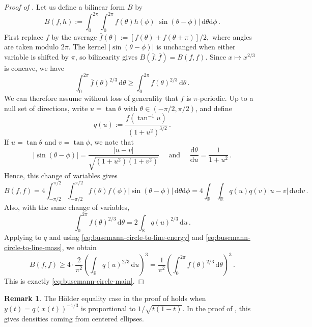 \documentclass[reqno, 11pt]{amsart}
\theoremstyle{definition}
\newtheorem{remark}{Remark}
\newcommand{\abs}[1]{\left\lvert#1\right\rvert}
\newcommand{\dd}{\mathrm{d}}
\begin{document}
\begin{proof}[Proof of ]
Let us define a bilinear form $B$ by
\[
        B(f,h):=\int_0^{2\pi}\int_0^{2\pi}
        f(\theta)h(\phi)\abs{\sin(\theta-\phi)}\,\dd\theta\dd\phi \,.
\]
First replace $f$ by the average $\bar f(\theta) := [f(\theta)+f(\theta+\pi)]/2,$ where angles are taken modulo $2\pi$.  The kernel $\abs{\sin(\theta-\phi)}$ is unchanged when either variable is shifted by $\pi$, so bilinearity gives $B(\bar f,\bar f)=B(f,f)$.  Since $x\mapsto x^{2/3}$ is concave, we have
\[
        \int_0^{2\pi} \bar f(\theta)^{2/3}\,\dd\theta
        \ge
        \int_0^{2\pi} f(\theta)^{2/3}\,\dd\theta\,.
\]
We can therefore assume without loss of generality that $f$ is $\pi$-periodic. Up to a null set of directions, write $u=\tan\theta$ with $\theta\in(-\pi/2,\pi/2)$, and define
\[
        q(u):=\frac{f(\tan^{-1} u)}{\,\,(1+u^2)^{3/2}}\,.
\]
If $u = \tan \theta$ and $v = \tan \phi$, we note that 
\[
        \abs{\sin(\theta-\phi)}
        =\frac{\abs{u-v}}{\sqrt{(1+u^2)(1+v^2)}}
        \quad \text{ and } \quad 
         \frac{\dd\theta}{\dd u}=\frac{1}{1+u^2}\,.
\]
Hence, this change of variables gives 
\begin{equation}\label{eq:busemann-circle-to-line-energy}
        B(f,f)
        =4\int_{-\pi/2}^{\pi/2}\int_{-\pi/2}^{\pi/2}
        f(\theta)f(\phi)\abs{\sin(\theta-\phi)}\,\dd\theta\dd\phi
        =4\int_{{\mathbb R}}\int_{{\mathbb R}}q(u)q(v)\abs{u-v}\,\dd u\dd v\,.
\end{equation}
Also, with the same change of variables,
\begin{equation}\label{eq:busemann-circle-to-line-mass}
        \int_0^{2\pi}f(\theta)^{2/3}\,\dd\theta
        =2\int_{{\mathbb R}}q(u)^{2/3}\,\dd u\,.
\end{equation}
Applying  to $q$ and using \eqref{eq:busemann-circle-to-line-energy} and \eqref{eq:busemann-circle-to-line-mass}, we obtain
\[
        B(f,f)
        \ge
        4\cdot\frac{2}{\pi^2}
        \left(\int_{{\mathbb R}}q(u)^{2/3}\,\dd u\right)^3
        =
        \frac1{\pi^2}
        \left(\int_0^{2\pi}f(\theta)^{2/3}\,\dd\theta\right)^3\,.
\]
This is exactly \eqref{eq:busemann-circle-main}.
\end{proof}

\begin{remark}
The  H\"older equality case in the proof of  holds when  $y(t)=q(x(t))^{-1/3}$ is proportional to $1/\sqrt{t(1-t)}$.  In the proof of , this gives densities coming from centered ellipses.
\end{remark}
\end{document}
